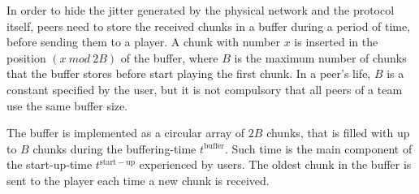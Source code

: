

\label{sec:buffering_chunks}

In order to hide the jitter generated by the physical network and the
protocol itself, peers need to store the received chunks in a buffer
during a period of time, before sending them to a player. A chunk with
number $x$ is inserted in the position $(x~\mathit{mod}~2B)$ of the
buffer, where $B$ is the maximum number of chunks that the buffer
stores before start playing the first chunk. In a peer's life, $B$ is
a constant specified by the user, but it is not compulsory that all
peers of a team use the same buffer size.

The buffer is implemented as a circular array of $2B$ chunks, that is
filled with up to $B$ chunks during the \gls{buffering-time}
$t^{\mathrm{buffer}}$.  Such time is the main component of the
\gls{start-up-time} $t^{\mathrm{start-up}}$ experienced by users. The
oldest chunk in the buffer is sent to the player each time a new chunk
is received.

\begin{comment}
Chunks with a higher number (newer chunks) are
inserted near of the head of the buffer. The (received) chunks pointed
by the tail of the buffer $i_p$ (the played chunk index) are sent to
the player. This action is carried out each time a new chunk is
received\footnote{DBS does not know anything about the content and
  therefore, about the timing of the chunks.}. During the playing
process, empty cells in the buffer (caused by the no reception on time
of the corresponding chunks) are filled with zeros, and sent to the
player.
\end{comment}

